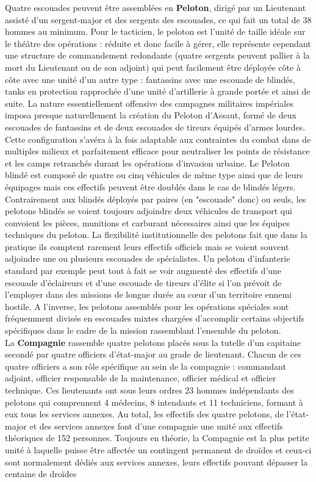 \documentclass[twoside]{article}
\begin{document}
Quatre escouades peuvent être assemblées en \textbf{Peloton}, dirigé par un Lieutenant assisté d'un sergent-major et des sergents des escouades, ce qui fait un total de 38 hommes au minimum. Pour le tacticien, le peloton est l'unité de taille idéale sur le théâtre des opérations : réduite et donc facile à gérer, elle représente cependant une structure de commandement redondante (quatre sergents peuvent pallier à la mort du Lieutenant ou de son adjoint) qui peut facilement être déployée côte à côte avec une unité d'un autre type : fantassins avec une escouade de blindés, tanks en protection rapprochée d'une unité d'artillerie à grande portée et ainsi de suite. La nature essentiellement offensive des campagnes militaires impériales imposa presque naturellement la création du Peloton d'Assaut, formé de deux escouades de fantassins et de deux escouades de tireurs équipés d'armes lourdes. Cette configuration s'avéra à la fois adaptable aux contraintes du combat dans de multiples milieux et parfaitement efficace pour neutraliser les points de résistance et les camps retranchés durant les opérations d'invasion urbaine. Le Peloton blindé est composé de quatre ou cinq véhicules de même type ainsi que de leurs équipages mais ces effectifs peuvent être doublés dans le cas de blindés légers. Contrairement aux blindés déployés par paires (en "escouade" donc) ou seuls, les pelotons blindés se voient toujours adjoindre deux véhicules de transport qui convoient les pièces, munitions et carburant nécessaires ainsi que les équipes techniques du peloton. La flexibilité institutionnelle des pelotons fait que dans la pratique ils comptent rarement leurs effectifs officiels mais se voient souvent adjoindre une ou plusieurs escouades de spécialistes. Un peloton d'infanterie standard par exemple peut tout à fait se voir augmenté des effectifs d'une escouade d'éclaireurs et d'une escouade de tireurs d'élite si l'on prévoit de l'employer dans des missions de longue durée au c\oe ur d'un territoire ennemi hostile. A l'inverse, les pelotons assemblés pour les opérations spéciales sont fréquemment divisés en escouades mixtes chargées d'accomplir certains objectifs spécifiques dans le cadre de la mission rassemblant l'ensemble du peloton.\\

La \textbf{Compagnie} rassemble quatre pelotons placés sous la tutelle d'un capitaine secondé par quatre officiers d'état-major au grade de lieutenant. Chacun de ces quatre officiers a son rôle spécifique au sein de la compagnie : commandant adjoint, officier responsable de la maintenance, officier médical et officier technique. Ces lieutenants ont sous leurs ordres 23 hommes indépendants des pelotons qui comprennent 4 médecins, 8 intendants et 11 techniciens, formant à eux tous les services annexes. Au total, les effectifs des quatre pelotons, de l'état-major et des services annexes font d'une compagnie une unité aux effectifs théoriques de 152 personnes. Toujours en théorie, la Compagnie est la plus petite unité à laquelle puisse être affectée un contingent permanent de droïdes et ceux-ci sont normalement dédiés aux services annexes, leurs effectifs pouvant dépasser la centaine de droïdes\\
\end{document}

